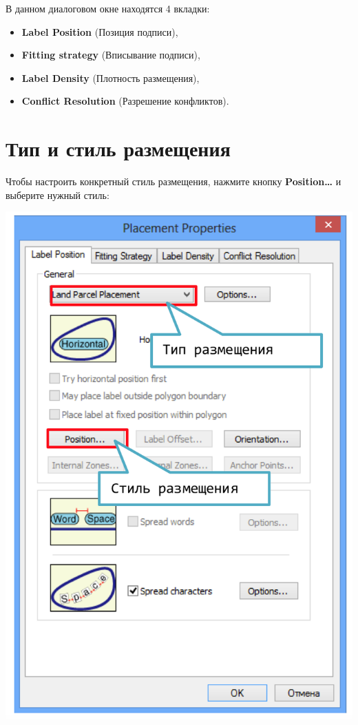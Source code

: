 \documentclass[12pt,]{book}
\begin{document}
В данном диалоговом окне находятся 4 вкладки:

\begin{itemize}
\item
  \textbf{Label Position} (Позиция подписи),
\item
  \textbf{Fitting strategy} (Вписывание подписи),
\item
  \textbf{Label Density} (Плотность размещения),
\item
  \textbf{Conflict Resolution} (Разрешение конфликтов).
\end{itemize}

\hypertarget{section-28}{%
\section{Тип и стиль размещения}\label{section-28}}

Чтобы настроить конкретный стиль размещения, нажмите кнопку \textbf{Position\ldots{}} и выберите нужный стиль:

\includegraphics{images/Appendix/image44.png}
\end{document}
